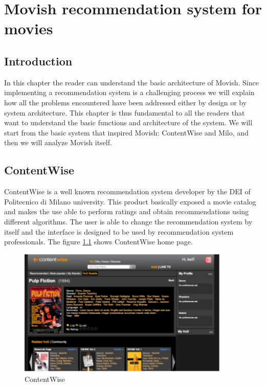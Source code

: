 \chapter{Movish recommendation system for movies}
\label{chapter:movish_system}

\section{Introduction}
\label{sec:movish_introduction}

In this chapter the reader can understand the basic architecture of Movish. Since implementing a recommendation system is a challenging process we will explain how all the problems encountered have been addressed either by design or by system architecture. This chapter is thus fundamental to all the readers that want to understand the basic functions and architecture of the system.
We will start from the basic system that inspired Movish: ContentWise and Milo, and then we will analyze Movish itself.

\section{ContentWise}
\label{sec:contentwise}

ContentWise is a well known recommendation system developer by the \ac{DEI} of Politecnico di Milano university. This product basically exposed a movie catalog and makes the use able to perform ratings and obtain recommendations using different algorithms. The user is able to change the recommendation system by itself and the interface is designed to be used by recommendation system professionals. The figure \ref{fig:contentwise} shows ContentWise home page.    

\begin{figure}
  \centering
  \includegraphics[width=0.9\textwidth]{figures/contentwise-homepage.png}
  \caption{ContentWise}
  \label{fig:contentwise}
\end{figure}

